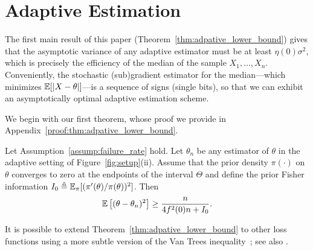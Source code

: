 \section{Adaptive Estimation \label{sec:sequential}}

The first main result of this paper (Theorem~\ref{thm:adpative_lower_bound})
gives that the asymptotic variance of any adaptive estimator must be at
least $\eta(0)\sigma^2$, which is precisely the efficiency of the median of
the sample $X_1,\ldots,X_n$. Conveniently, the stochastic (sub)gradient
estimator for the median---which minimizes $\mathbb{E}[|X - \theta|]$---is a
sequence of signs (single bits), so that we can exhibit an asymptotically
optimal adaptive estimation scheme.


We begin with our first theorem, whose proof we provide in
Appendix~\ref{proof:thm:adpative_lower_bound}.
\begin{thm}\label{thm:adpative_lower_bound}
  Let Assumption~\ref{assump:failure_rate} hold.
  Let ${\theta}_n$ be any estimator of $\theta$ in the adaptive setting of
  Figure~\ref{fig:setup}(ii). Assume that the prior
  density $\pi(\cdot)$ on $\theta$ converges to zero
  at the endpoints of the interval $\Theta$ and
  define the prior Fisher information
  $I_0 \triangleq \mathbb{E}_\pi[(\pi'(\theta) / \pi(\theta))^2]$.
  Then
  \begin{equation*}
    \mathbb{E}\left[ (\theta-{\theta}_n)^2 \right] \geq   \frac{n}{ 4f^2(0) n + I_0}.
  \end{equation*}
\end{thm}


It is possible to extend Theorem~\ref{thm:adpative_lower_bound} to other
loss functions using a more subtle version of the Van Trees
inequality~\cite{efroimovich1980information}; see also
\cite{DBLP:journals/corr/abs-1902-08582}.

